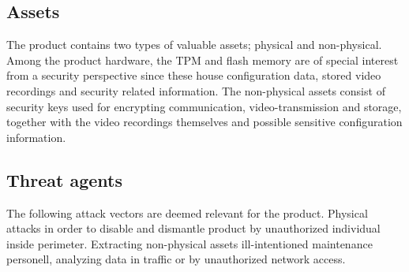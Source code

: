 \documentclass[10pt]{article}
\begin{document}
    \subsection{Assets}

      The product contains two types of valuable assets; physical and
      non-physical. Among the product hardware, the TPM and flash memory
      are of special interest from a security perspective since these house
      configuration data, stored video recordings and security related
      information. The non-physical assets consist of security keys used for
      encrypting communication, video-transmission and storage, together with
      the video recordings themselves and possible sensitive configuration
      information.

    \subsection{Threat agents}

      The following attack vectors are deemed relevant for the product.
      Physical attacks in order to disable and dismantle product by
      unauthorized individual inside perimeter. Extracting non-physical
      assets ill-intentioned maintenance personell, analyzing data in
      traffic or by unauthorized network access.
\end{document}
